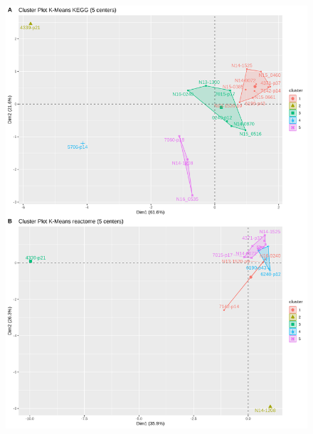 \begin{figure}
    \includegraphics[width=\textwidth]{img/plot_cluster_pdcl}
    \caption{
    }
    \label{fig:}
\end{figure}